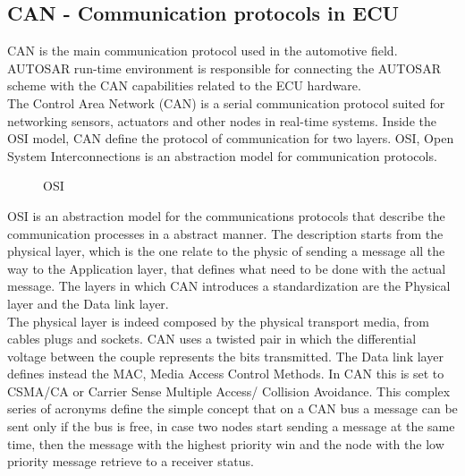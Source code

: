 \documentclass[../main.tex]{subfiles}
\begin{document}
\subsection{CAN - Communication protocols in ECU}
\gls{CAN} is the main communication protocol used in the automotive field. \gls{AUTOSAR} run-time environment is responsible for connecting the \gls{AUTOSAR} scheme with the \gls{CAN} capabilities related to the \gls{ECU} hardware.\\
The Control Area Network (\gls{CAN}) is a serial communication protocol suited for networking sensors, actuators and other nodes in real-time systems. Inside the \gls{OSI} model, \gls{CAN} define the protocol of communication for two layers. \gls{OSI}, Open System Interconnections is an abstraction model for communication protocols. 
\begin{figure}[htbp]
    \centering
{}
    \caption{OSI}
    \label{fig:ECUstructure}
\end{figure}
\gls{OSI} is an abstraction model for the communications protocols that describe the communication processes in a abstract manner. The description starts from the physical layer, which is the one relate to the physic of sending a message all the way to the Application layer, that defines what need to be done with the actual message. The layers in which \gls{CAN} introduces a standardization are the Physical layer and the Data link layer.\\
The physical layer is indeed composed by the physical transport media, from cables plugs and sockets. \gls{CAN} uses a twisted pair in which the differential voltage between the couple represents the bits transmitted. The Data link layer defines instead the \gls{MAC}, Media Access Control Methods. In \gls{CAN} this is set to \gls{CSMA/CA} or Carrier Sense Multiple Access/ Collision Avoidance. This complex series of acronyms define the simple concept that on a \gls{CAN} \gls{bus} a message can be sent only if the \gls{bus} is free, in case two nodes start sending a message at the same time, then the message with the highest priority win and the node with the low priority message retrieve to a receiver status.
\end{document}
